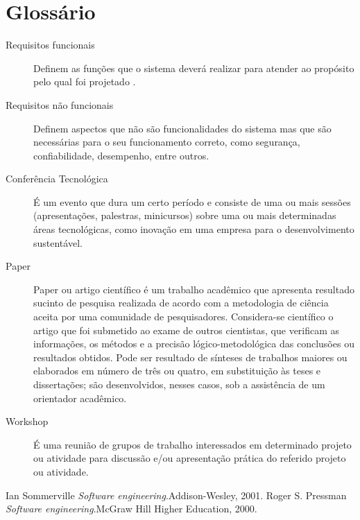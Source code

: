 \documentclass[letter]{article}
\begin{document}
\section{Glossário}
\begin{description}
\item[Requisitos funcionais] 
Definem as funções que o sistema deverá realizar para atender ao propósito pelo qual foi projetado .
\item [Requisitos não funcionais]
Definem aspectos que não são funcionalidades do sistema mas que são necessárias para o seu funcionamento
correto, como segurança, confiabilidade, desempenho, entre outros.

\item[Conferência Tecnológica] É um evento que dura um certo período e consiste de uma ou mais sessões (apresentações, palestras, minicursos) sobre uma ou mais determinadas áreas tecnológicas, como inovação em uma empresa para o desenvolvimento sustentável.

\item[Paper] Paper ou artigo científico é um trabalho acadêmico que apresenta resultado sucinto de pesquisa realizada de acordo com a metodologia de ciência aceita por uma comunidade de pesquisadores. Considera-se científico o artigo que foi submetido ao exame de outros cientistas, que verificam as informações, os métodos e a precisão lógico-metodológica das conclusões ou resultados obtidos. Pode ser resultado de sínteses de trabalhos maiores ou elaborados em número de três ou quatro, em substituição às teses e dissertações; são desenvolvidos, nesses casos, sob a assistência de um orientador acadêmico.

\item[Workshop] É uma reunião de grupos de trabalho interessados em determinado projeto ou atividade para discussão e/ou apresentação prática do referido projeto ou atividade.
\end{description}

\vspace{-12mm}
\renewcommand{\refname}{\section{Referências}}
  \begin{thebibliography}{2}  
\vspace{-5mm}
         Ian Sommerville  \newblock\emph{Software engineering}.\newblock Addison-Wesley, 2001. 
       Roger S. Pressman \newblock\emph{Software engineering}.\newblock McGraw Hill Higher Education, 2000.
  \end{thebibliography}  
\end{document}
